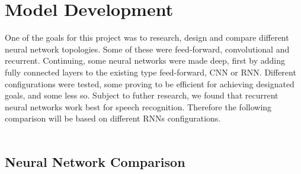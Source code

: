 \chapter{Model Development}\label{ch:model_development}
One of the goals for this project was to research, design and compare different neural network topologies. 
Some of these were feed-forward, convolutional and recurrent.
Continuing, some neural networks were made deep, first by adding fully connected layers to the existing type feed-forward, CNN or RNN.
Different configurations were tested, some proving to be efficient for achieving designated goals, and some less so.
Subject to futher research, we found that recurrent neural networks work best for speech recognition.
Therefore  the following comparison will be based on different RNNs configurations.\\\\

\section{Neural Network Comparison}\label{sec:NNComparison}

